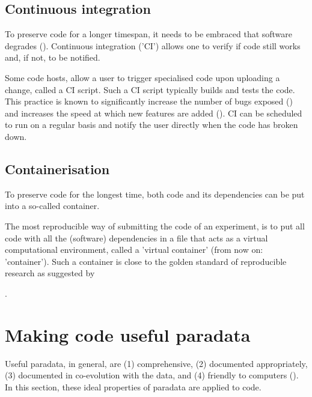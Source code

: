 \subsection{Continuous integration}

To preserve code for a longer timespan, 
it needs to be embraced that software degrades (\cite{beck2000extreme}).
Continuous integration ('CI') allows one to 
verify if code still works and, if not, to be notified.


Some code hosts,
allow a user to trigger specialised code upon uploading a change,
called a CI script.
Such a CI script typically builds and tests the code.
This practice is known to significantly 
increase the number of bugs exposed (\cite{vasilescu2015}) and increases
the speed at which new features are added (\cite{vasilescu2015}).
CI can be scheduled to run on a regular basis and
notify the user directly when the code has broken down.

\subsection{Containerisation}

To preserve code for the longest time, 
both code and its dependencies can be put into a so-called container.

The most reproducible way of submitting the code of an experiment,
is to put all code with all the (software) dependencies
in a file that acts as a virtual computational environment,
called a 'virtual container' (from now on: 'container').
Such a container is close to the golden standard of reproducible research
as suggested by 
\cite{peng2011reproducible} 

.

\section{Making code useful paradata}\label{sec:making-code-useful-paradata}

Useful paradata, in general, are (1) comprehensive,
(2) documented appropriately, (3) documented in co-evolution with the data,
and (4) friendly to computers (\cite{huvila2022improving}).
In this section, these ideal properties of paradata are applied to code.

